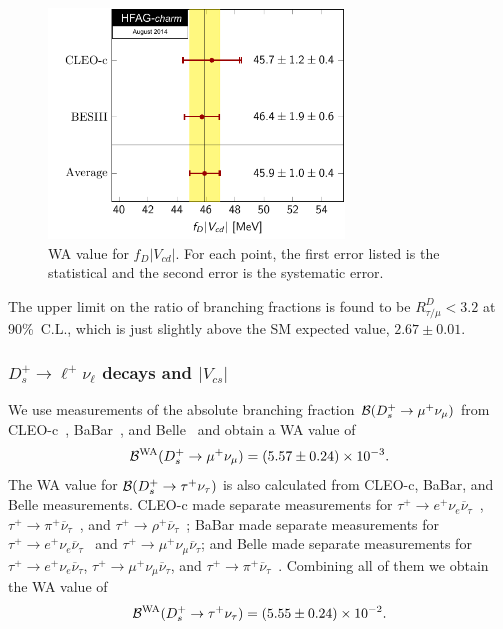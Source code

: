 \begin{figure}[hbt!]
\centering
\includegraphics[width=0.7\textwidth]{figures/charm/fDVcd.pdf}
\caption{
WA value for $f_{D}|V_{cd}|$. For each point, the first error listed is the statistical and the second error is the systematic error.
\label{fig:ExpDLeptonic}
}
\end{figure}
 
The upper limit on the ratio of branching fractions is found to be $R_{\tau/\mu}^D<3.2$ at 90\%~C.L., which is just slightly above the SM expected value, $2.67\pm0.01$.

\subsubsection{$D_s^+\to \ell^+\nu_{\ell}$ decays and $|V_{cs}|$}

We use measurements of the absolute branching fraction ${\cal B}(D_s^+\to\mu^+\nu_{\mu})$ from CLEO-c~\cite{Alexander:2009ux}, BaBar~\cite{delAmoSanchez:2010jg},
and Belle~\cite{Zupanc:2013byn} and obtain a WA value of
\[
 {\cal B}^{\rm WA}(D_{s}^+\to\mu^+\nu_{\mu}) = (5.57\pm0.24)\times10^{-3}.
\]
The WA value for ${\cal B}(D_s^+\to\tau^+\nu_{\tau})$ is also calculated from CLEO-c, BaBar, and Belle measurements. 
CLEO-c made separate measurements for $\tau^+\to e^+\nu_e\overline{\nu}{}_{\tau}$~\cite{Naik:2009tk},
$\tau^+\to\pi^+\overline{\nu}{}_{\tau}$~\cite{Alexander:2009ux}, and
$\tau^+\to\rho^+\overline{\nu}{}_{\tau}$~\cite{Onyisi:2009th};
BaBar made separate measurements for 
$\tau^+\to e^+\nu_e\overline{\nu}{}_{\tau}$~\cite{delAmoSanchez:2010jg} and $\tau^+\to \mu^+\nu_{\mu}\overline{\nu}{}_{\tau}$; and
Belle made separate measurements for $\tau^+\to e^+\nu_e\overline{\nu}{}_{\tau}$, $\tau^+\to \mu^+\nu_{\mu}\overline{\nu}{}_{\tau}$, 
and $\tau^+\to\pi^+\overline{\nu}{}_{\tau}$~\cite{Zupanc:2013byn}.
Combining all of them we obtain the WA value of
\[
 {\cal B}^{\rm WA}(D_{s}^+\to\tau^+\nu_{\tau}) = (5.55\pm0.24)\times10^{-2}.
\]

